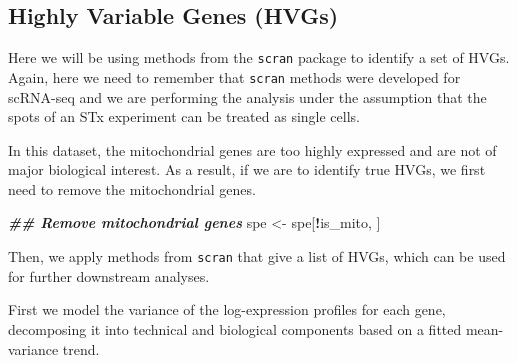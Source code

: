 \documentclass[
]{book}
\newenvironment{Shaded}{\begin{snugshade}}{\end{snugshade}}
\newcommand{\DocumentationTok}[1]{\textcolor[rgb]{0.56,0.35,0.01}{\textbf{\textit{#1}}}}
\newcommand{\NormalTok}[1]{#1}
\newcommand{\OtherTok}[1]{\textcolor[rgb]{0.56,0.35,0.01}{#1}}
\newcommand{\SpecialCharTok}[1]{\textcolor[rgb]{0.81,0.36,0.00}{\textbf{#1}}}
\begin{document}
\hypertarget{highly-variable-genes-hvgs}{%
\subsection{Highly Variable Genes (HVGs)}\label{highly-variable-genes-hvgs}}

Here we will be using methods from the \texttt{scran} package \citep{Lun2016Oct} to identify a set of HVGs. Again, here we need to remember that \texttt{scran} methods were developed for scRNA-seq and we are performing the analysis under the assumption that the spots of an STx experiment can be treated as single cells.

In this dataset, the mitochondrial genes are too highly expressed and are not of major biological interest. As a result, if we are to identify true HVGs, we first need to remove the mitochondrial genes.

\begin{Shaded}
\begin{Highlighting}[]
\DocumentationTok{\#\# Remove mitochondrial genes}
\NormalTok{spe }\OtherTok{\textless{}{-}}\NormalTok{ spe[}\SpecialCharTok{!}\NormalTok{is\_mito, ]}
\end{Highlighting}
\end{Shaded}

Then, we apply methods from \texttt{scran} that give a list of HVGs, which can be used for further downstream analyses.

First we model the variance of the log-expression profiles for each gene, decomposing it into technical and biological components based on a fitted mean-variance trend.
\end{document}
